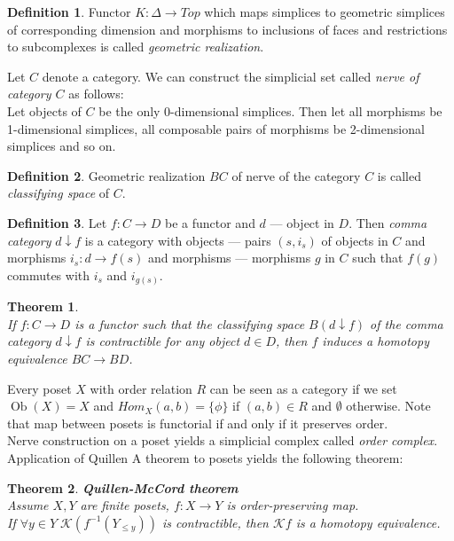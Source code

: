 \documentclass[a4paper, 12pt]{article}
\newtheorem{theorem}{Theorem}
\theoremstyle{definition}
\newtheorem{definition}{Definition}
\theoremstyle{remark}
\newcommand{\define}[1]{{\textit{#1}}}
\begin{document}
\begin{definition}
  Functor $K : \Delta \to Top$ which maps simplices to geometric simplices of corresponding dimension and morphisms to inclusions of faces and restrictions to subcomplexes is called \define{geometric realization}.
\end{definition}

Let $C$ denote a category. We can construct the simplicial set called \define{nerve of category $C$} as follows:\\
Let objects of $C$ be the only 0-dimensional simplices. Then let all morphisms be 1-dimensional simplices, all composable pairs of morphisms be 2-dimensional simplices and so on.

\begin{definition}
  Geometric realization $BC$ of nerve of the category $C$ is called \define{classifying space} of $C$.
\end{definition}

\begin{definition}
  Let $f: C \to D$ be a functor and $d$ --- object in $D$. Then \define{comma category} $d \downarrow f$ is a category with objects --- pairs $(s,i_s)$ of objects in $C$ and morphisms $i_s : d \to f(s)$ and morphisms --- morphisms $g$ in $C$ such that $f(g)$ commutes with $i_s$ and $i_{g(s)}$.
\end{definition}

\begin{theorem} {\cite[Theorem A]{Quillen72}}\\
  If $f: C \to D$ is a functor such that the classifying space $B(d \downarrow f)$ of the comma category $d \downarrow f$ is contractible for any object $d \in D$, then $f$ induces a homotopy equivalence $BC \to BD$.
\end{theorem}

Every poset $X$ with order relation $R$ can be seen as a category if we set $\operatorname{Ob}(X) = X$ and $Hom_X(a,b) = \{\phi\}$ if $(a,b) \in R$ and $\emptyset$ otherwise. Note that map between posets is functorial if and only if it preserves order.\\
Nerve construction on a poset yields a simplicial complex called \define{order complex}. Application of Quillen A theorem to posets yields the following theorem:

\begin{theorem} \textbf{Quillen-McCord theorem}\\
  Assume $X, Y$ are finite posets, $f : X \to Y$ is order-preserving map.\\
  If $\forall y \in Y\;\mathcal{K}(f^{-1}(Y_{\leqslant y}))$ is contractible, then $\mathcal{K}f$ is a homotopy equivalence.\\
\end{theorem}
\end{document}
